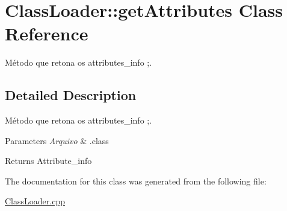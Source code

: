 \hypertarget{class_class_loader_1_1get_attributes}{}\section{Class\+Loader\+:\+:get\+Attributes Class Reference}
\label{class_class_loader_1_1get_attributes}


Método que retona os attributes\+\_\+info ;.  




\subsection{Detailed Description}
Método que retona os attributes\+\_\+info ;. 


\begin{DoxyParams}{Parameters}
{\em Arquivo} & .class \\
\hline
\end{DoxyParams}
\begin{DoxyReturn}{Returns}
Attribute\+\_\+info 
\end{DoxyReturn}


The documentation for this class was generated from the following file\+:\begin{DoxyCompactItemize}
\item 
\hyperlink{_class_loader_8cpp}{Class\+Loader.\+cpp}\end{DoxyCompactItemize}
